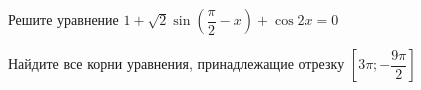 \begin{ex}
	\begin{condition}
		\begin{enumcols}[label=\asbuk*)]
			\item Решите уравнение \( 1 + \sqrt{2}\sin{\left(\dfrac{\pi}{2}-x\right)}+\cos 2x=0 \)
			\item Найдите все корни уравнения, принадлежащие отрезку \( \left[3\pi;-\dfrac{9\pi}{2}\right] \)
		\end{enumcols}
	\end{condition}
\end{ex}